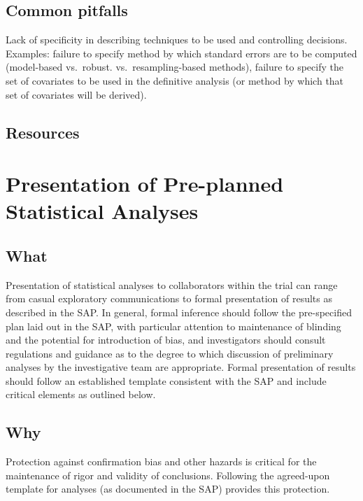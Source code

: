 \documentclass[]{book}
\theoremstyle{definition}
\theoremstyle{definition}
\theoremstyle{definition}
\theoremstyle{remark}
\begin{document}
\subsection{Common pitfalls}\label{common-pitfalls-1}

Lack of specificity in describing techniques to be used and controlling
decisions. Examples: failure to specify method by which standard errors
are to be computed (model-based vs.~robust. vs.~resampling-based
methods), failure to specify the set of covariates to be used in the
definitive analysis (or method by which that set of covariates will be
derived).

\subsection{Resources}\label{resources-1}

\section{Presentation of Pre-planned Statistical
Analyses}\label{presentation-of-pre-planned-statistical-analyses}

\subsection{What}\label{what-4}

Presentation of statistical analyses to collaborators within the trial
can range from casual exploratory communications to formal presentation
of results as described in the SAP. In general, formal inference should
follow the pre-specified plan laid out in the SAP, with particular
attention to maintenance of blinding and the potential for introduction
of bias, and investigators should consult regulations and guidance as to
the degree to which discussion of preliminary analyses by the
investigative team are appropriate. Formal presentation of results
should follow an established template consistent with the SAP and
include critical elements as outlined below.

\subsection{Why}\label{why-4}

Protection against confirmation bias and other hazards is critical for
the maintenance of rigor and validity of conclusions. Following the
agreed-upon template for analyses (as documented in the SAP) provides
this protection.
\end{document}
